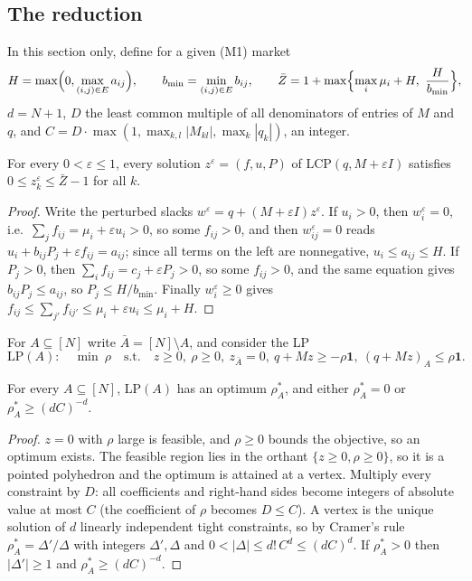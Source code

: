 \subsection{The reduction}

In this section only, define for a given (M1) market
\[
  H=\max\Bigl(0,\max_{(i,j)\in E}a_{ij}\Bigr),\qquad b_{\min}=\min_{(i,j)\in E}b_{ij},\qquad
  \bar Z=1+\max\Bigl\{\max_i\mu_i+H,\ \frac{H}{b_{\min}}\Bigr\},
\]
$d=N+1$, $D$ the least common multiple of all denominators of entries of $M$ and $q$, and
$C=D\cdot\max(1,\max_{k,l}|M_{kl}|,\max_k|q_k|)$, an integer.

\begin{lemma}\label{plcp:lem:bound}
For every $0<\varepsilon\le1$, every solution $z^\varepsilon=(f,u,P)$ of $\mathrm{LCP}(q,M+\varepsilon I)$
satisfies $0\le z^\varepsilon_k\le\bar Z-1$ for all $k$.
\end{lemma}

\begin{proof}
Write the perturbed slacks $w^\varepsilon=q+(M+\varepsilon I)z^\varepsilon$. If $u_i>0$, then
$w^\varepsilon_i=0$, i.e.\ $\sum_jf_{ij}=\mu_i+\varepsilon u_i>0$, so some $f_{ij}>0$, and then
$w^\varepsilon_{ij}=0$ reads $u_i+b_{ij}P_j+\varepsilon f_{ij}=a_{ij}$; since all terms on the left are
nonnegative, $u_i\le a_{ij}\le H$. If $P_j>0$, then $\sum_if_{ij}=c_j+\varepsilon P_j>0$, so some
$f_{ij}>0$, and the same equation gives $b_{ij}P_j\le a_{ij}$, so $P_j\le H/b_{\min}$. Finally
$w^\varepsilon_i\ge0$ gives $f_{ij}\le\sum_{j'}f_{ij'}\le\mu_i+\varepsilon u_i\le\mu_i+H$.
\end{proof}

For $A\subseteq[N]$ write $\bar A=[N]\setminus A$, and consider the LP
\[
  \mathrm{LP}(A):\quad\min\ \rho\quad\text{s.t.}\quad z\ge0,\ \rho\ge0,\ z_{\bar A}=0,\
  q+Mz\ge-\rho\mathbf 1,\ (q+Mz)_A\le\rho\mathbf 1 .
\]

\begin{lemma}\label{plcp:lem:gap}
For every $A\subseteq[N]$, $\mathrm{LP}(A)$ has an optimum $\rho^*_A$, and either $\rho^*_A=0$ or
$\rho^*_A\ge(dC)^{-d}$.
\end{lemma}

\begin{proof}
$z=0$ with $\rho$ large is feasible, and $\rho\ge0$ bounds the objective, so an optimum exists. The
feasible region lies in the orthant $\{z\ge0,\rho\ge0\}$, so it is a pointed polyhedron and the optimum
is attained at a vertex. Multiply every constraint by $D$: all coefficients and right-hand sides become
integers of absolute value at most $C$ (the coefficient of $\rho$ becomes $D\le C$). A vertex is the
unique solution of $d$ linearly independent tight constraints, so by Cramer's rule
$\rho^*_A=\Delta'/\Delta$ with integers $\Delta',\Delta$ and $0<|\Delta|\le d!\,C^d\le(dC)^d$. If
$\rho^*_A>0$ then $|\Delta'|\ge1$ and $\rho^*_A\ge(dC)^{-d}$.
\end{proof}

